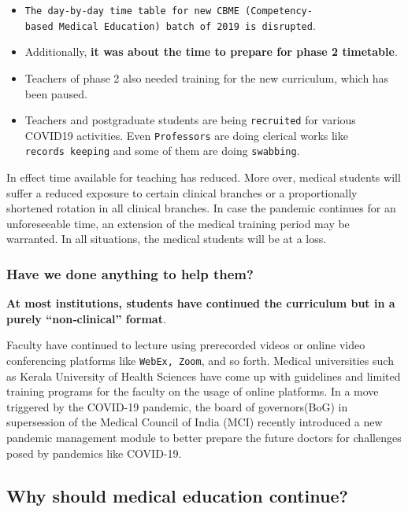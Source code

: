 \documentclass[
]{article}
\providecommand{\tightlist}{%
  \setlength{\itemsep}{0pt}\setlength{\parskip}{0pt}}
\begin{document}
\begin{itemize}
\tightlist
\item
  \texttt{The\ day-by-day\ time\ table\ for\ new\ CBME\ (Competency-based\ Medical\ Education)\ batch\ of\ 2019\ is\ disrupted}.
\item
  Additionally, \textbf{it was about the time to prepare for phase 2
  timetable}.
\item
  Teachers of phase 2 also needed training for the new curriculum, which
  has been paused.
\item
  Teachers and postgraduate students are being \texttt{recruited} for
  various COVID19 activities. Even \texttt{Professors} are doing
  clerical works like \texttt{records\ keeping} and some of them are
  doing \texttt{swabbing}.
\end{itemize}

In effect time available for teaching has reduced. More over, medical
students will suffer a reduced exposure to certain clinical branches or
a proportionally shortened rotation in all clinical branches. In case
the pandemic continues for an unforeseeable time, an extension of the
medical training period may be warranted. In all situations, the medical
students will be at a loss.

\hypertarget{have-we-done-anything-to-help-them}{%
\subsubsection{Have we done anything to help
them?}\label{have-we-done-anything-to-help-them}}

\textbf{At most institutions, students have continued the curriculum but
in a purely ``non‐clinical'' format}.

Faculty have continued to lecture using prerecorded videos or online
video conferencing platforms like \texttt{WebEx,\ Zoom}, and so forth.
Medical universities such as Kerala University of Health Sciences have
come up with guidelines and limited training programs for the faculty on
the usage of online platforms. In a move triggered by the COVID-19
pandemic, the board of governors(BoG) in supersession of the Medical
Council of India (MCI) recently introduced a new pandemic management
module to better prepare the future doctors for challenges posed by
pandemics like COVID-19.

\hypertarget{why-should-medical-education-continue}{%
\subsection{Why should medical education
continue?}\label{why-should-medical-education-continue}}
\end{document}
